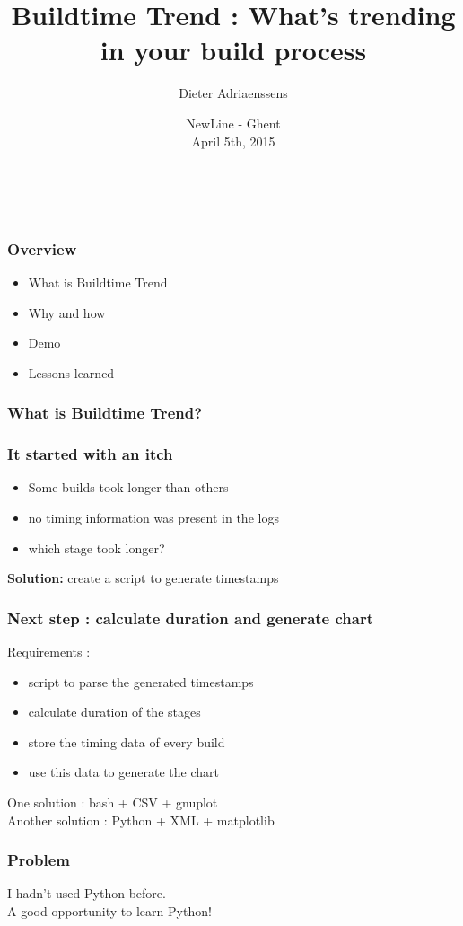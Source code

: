 \documentclass[14pt]{beamer}
\title[Buildtime Trend : What, why and how]{Buildtime Trend : What's trending in your build process}
\author{Dieter Adriaenssens}
\institute[Buildtime Trend]{Buildtime Trend founder, developer - @dcadriaenssens}
\date[NewLine 5Apr2015]{NewLine - Ghent\\
April 5th, 2015}
\begin{document}
  \begin{frame}
    \titlepage
    \vfill
    \begin{center}
      \\[2.5ex]
        {\tiny\CcNote{\CcLongnameByNcSa}}
        \vspace*{-2.5ex}
    \end{center}
  \end{frame}
  \begin{frame}
    \frametitle{Overview}
    \begin{itemize}
      \item What is Buildtime Trend
      \item Why and how
      \item Demo
      \item Lessons learned
    \end{itemize}
  \end{frame}
  \begin{frame}
    \frametitle{What is Buildtime Trend?}
  \end{frame}
  \begin{frame}
    \frametitle{It started with an itch}
    \begin{itemize}
      \item Some builds took longer than others
      \item no timing information was present in the logs
      \item which stage took longer?
    \end{itemize}
    \pause
    \textbf{Solution:} create a script to generate timestamps
  \end{frame}
  \begin{frame}
    \frametitle{Next step : calculate duration and generate chart}
    Requirements :
    \begin{itemize}
      \item script to parse the generated timestamps
      \item calculate duration of the stages
      \item store the timing data of every build
      \item use this data to generate the chart
    \end{itemize}
    \pause
    One solution : bash + CSV + gnuplot\\
    \pause
    Another solution : Python + XML + matplotlib
  \end{frame}
  \begin{frame}
    \frametitle{Problem}
    I hadn't used Python before.\\
    \pause
    A good opportunity to learn Python!
  \end{frame}
\end{document}
